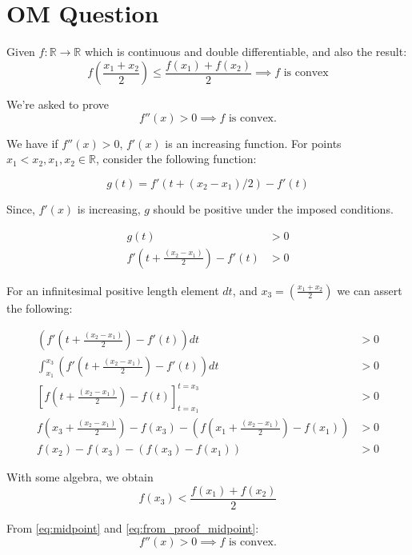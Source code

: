 \documentclass{article}
\begin{document}
\section{OM Question}
Given $f:\mathbb{R}\rightarrow\mathbb{R}$ which is continuous and double differentiable, and also the result:
\begin{equation}\label{eq:midpoint}
	f(\frac{x_1  + x_2}{2}) \leq \frac{f(x_1) + f(x_2)}{2} \implies f\text{ is convex}
\end{equation}

We're asked to prove
\begin{equation} 
	f''(x) > 0 \implies f\text{ is convex}.
\end{equation}

We have if $f''(x) > 0$, $f'(x)$ is an increasing function. For points $x_1 < x_2, x_1, x_2 \in \mathbb{R}$, consider the following function:

\begin{equation}
	g(t) = f'(t + (x_2-x_1)/2) - f'(t)
\end{equation}

Since, $f'(x)$ is increasing, $g$ should be positive under the imposed conditions.

\begin{align*}
	g(t) & > 0\\
	f'\left(t + \frac{(x_2-x_1)}{2}\right) - f'(t) & > 0
\end{align*}

For an infinitesimal positive length element $dt$, and $x_3 = \left(\frac{x_1+x_2}{2}\right)$ we can assert the following:

\begin{align*}
\left(f'\left(t + \frac{(x_2-x_1)}{2}\right) - f'(t)\right)dt &> 0 \\
\int_{x_1}^{x_3}{\left(f'\left(t + \frac{(x_2-x_1)}{2}\right) - f'(t)\right)dt} &> 0 \\
\left[f\left(t + \frac{(x_2-x_1)}{2}\right) - f(t)\right]_{t=x_1}^{t=x_3} &> 0\\
f\left(x_3 + \frac{(x_2-x_1)}{2}\right) - f(x_3) - \left(f\left(x_1 + \frac{(x_2-x_1)}{2}\right) - f(x_1)\right) &> 0\\
f\left(x_2\right) - f(x_3) - \left(f\left(x_3\right) - f(x_1)\right) &> 0
\end{align*}

With some algebra, we obtain
\begin{equation}\label{eq:from_proof_midpoint}
	f(x_3) < \frac{f(x_1) + f(x_2)}{2}
\end{equation}

From \eqref{eq:midpoint} and \eqref{eq:from_proof_midpoint}:
\begin{equation}
		f''(x) > 0 \implies f\text{ is convex}.
\end{equation} 
 
\end{document}
